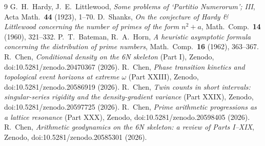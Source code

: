 \documentclass[11pt]{article}
\theoremstyle{definition}
\begin{document}
\begin{thebibliography}{9}
 G.~H.~Hardy, J.~E.~Littlewood, \emph{Some problems of `Partitio Numerorum'; III}, Acta Math.\ \textbf{44} (1923), 1--70.
 D.~Shanks, \emph{On the conjecture of Hardy \& Littlewood concerning the number of primes of the form $n^2+a$}, Math.\ Comp.\ \textbf{14} (1960), 321--332.
 P.~T.~Bateman, R.~A.~Horn, \emph{A heuristic asymptotic formula concerning the distribution of prime numbers}, Math.\ Comp.\ \textbf{16} (1962), 363--367.
 R.~Chen, \emph{Conditional density on the 6N skeleton} (Part I), Zenodo, doi:10.5281/zenodo.20470367 (2026).
 R.~Chen, \emph{Phase transition kinetics and topological event horizons at extreme $\omega$} (Part XXIII), Zenodo, doi:10.5281/zenodo.20586919 (2026).
 R.~Chen, \emph{Twin counts in short intervals: singular-series rigidity and the density-gradient variance} (Part XXIX), Zenodo, doi:10.5281/zenodo.20597725 (2026).
 R.~Chen, \emph{Prime arithmetic progressions as a lattice resonance} (Part XXX), Zenodo, doi:10.5281/zenodo.20598405 (2026).
 R.~Chen, \emph{Arithmetic geodynamics on the 6N skeleton: a review of Parts I--XIX}, Zenodo, doi:10.5281/zenodo.20585301 (2026).
\end{thebibliography}
\end{document}
